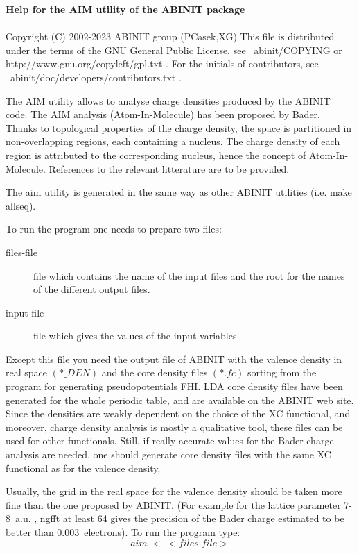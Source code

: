 \documentclass[11pt]{article}
\begin{document}
{\Huge \bf Help for the AIM utility of the ABINIT package} \\ \\

     Copyright (C) 2002-2023 ABINIT group (PCasek,XG)
     This file is distributed under the terms of the
     GNU General Public License, see ~abinit/COPYING
     or http://www.gnu.org/copyleft/gpl.txt .
     For the initials of contributors, see ~abinit/doc/developers/contributors.txt .

The AIM utility allows to analyse charge densities
produced by the ABINIT code. The AIM analysis (Atom-In-Molecule)
has been proposed by Bader. Thanks to topological
properties of the charge density, the space is partitioned
in non-overlapping regions, each containing a nucleus.
The charge density of each region is attributed to the
corresponding nucleus, hence the concept of Atom-In-Molecule.
References to the relevant litterature are to be provided.

The aim utility is generated in the same way as other
ABINIT utilities (i.e. make allseq).

To run the program one needs to prepare two files:
\begin{description}
\item [files-file] file which contains the name of the input files and the
root for the names of the different output files.
\item [input-file] file which gives the values of the input variables
\end{description}
Except this file you need the output file of ABINIT with the valence
density in real space $(*\_DEN)$ and the core density files $(*.fc)$ sorting
from the program for generating pseudopotentials FHI.
LDA core density files have been generated for the
whole periodic table, and are available on the ABINIT web site.
Since the densities are weakly dependent on the choice of the
XC functional, and moreover, charge density analysis
is mostly a qualitative tool, these files can be used
for other functionals. Still, if really accurate
values for the Bader charge analysis are needed, one should
generate core density files with the same XC functional as
for the valence density.

Usually, the grid in the real space for the valence density should be
taken more fine than the one proposed by ABINIT.
(For example for the lattice parameter 7-8~a.u. , ngfft at least 64
gives the precision of the Bader charge estimated to be better
than 0.003~electrons).
To run the program type: $$aim\; < \; <files.file> $$
\end{document}
